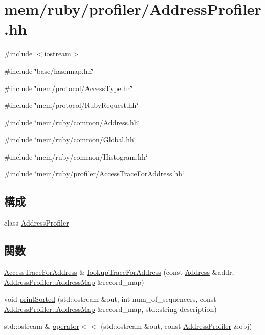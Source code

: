 \hypertarget{AddressProfiler_8hh}{
\section{mem/ruby/profiler/AddressProfiler.hh}
\label{AddressProfiler_8hh}
}
{\ttfamily \#include $<$iostream$>$}\par
{\ttfamily \#include \char`\"{}base/hashmap.hh\char`\"{}}\par
{\ttfamily \#include \char`\"{}mem/protocol/AccessType.hh\char`\"{}}\par
{\ttfamily \#include \char`\"{}mem/protocol/RubyRequest.hh\char`\"{}}\par
{\ttfamily \#include \char`\"{}mem/ruby/common/Address.hh\char`\"{}}\par
{\ttfamily \#include \char`\"{}mem/ruby/common/Global.hh\char`\"{}}\par
{\ttfamily \#include \char`\"{}mem/ruby/common/Histogram.hh\char`\"{}}\par
{\ttfamily \#include \char`\"{}mem/ruby/profiler/AccessTraceForAddress.hh\char`\"{}}\par
\subsection*{構成}
\begin{DoxyCompactItemize}
\item 
class \hyperlink{classAddressProfiler}{AddressProfiler}
\end{DoxyCompactItemize}
\subsection*{関数}
\begin{DoxyCompactItemize}
\item 
\hyperlink{classAccessTraceForAddress}{AccessTraceForAddress} \& \hyperlink{AddressProfiler_8hh_a4e6cbe0e614b5baaeb362e356a386ce5}{lookupTraceForAddress} (const \hyperlink{classAddress}{Address} \&addr, \hyperlink{classAddressProfiler_a8a9f1225b5c1cb2d26e7cea035910b56}{AddressProfiler::AddressMap} \&record\_\-map)
\item 
void \hyperlink{AddressProfiler_8hh_ae2245db015c072683d3fd3ddce063bac}{printSorted} (std::ostream \&out, int num\_\-of\_\-sequencers, const \hyperlink{classAddressProfiler_a8a9f1225b5c1cb2d26e7cea035910b56}{AddressProfiler::AddressMap} \&record\_\-map, std::string description)
\item 
std::ostream \& \hyperlink{AddressProfiler_8hh_a903d5ae9799120d03239d7a6496bbdf7}{operator$<$$<$} (std::ostream \&out, const \hyperlink{classAddressProfiler}{AddressProfiler} \&obj)
\end{DoxyCompactItemize}


